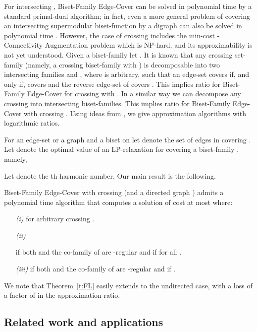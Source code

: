 For intersecting , {\sf Biset-Family Edge-Cover} can be solved in polynomial time by a 
standard primal-dual algorithm; in fact, even a more general problem of covering an intersecting supermodular 
biset-function by a digraph can also be solved in polynomial time \cite{F-R}. 
However, the case of crossing  includes the min-cost {\sf -Connectivity Augmentation} problem
which is NP-hard, and its approxi\-mability is not yet understood.
Given a biset-family  let .
It is known that any crossing set-family  
(namely, a crossing biset-family  with ) 
is decomposable into two intersecting families 
 and 
, where  is arbitrary,
such that an edge-set  covers  if, and only if,  covers  
and the reverse edge-set of  covers .
This implies ratio  for {\sf Biset-Family Edge-Cover} for crossing 
with .
In a similar way we can decompose any crossing  into 
 intersecting biset-families. 
This implies ratio  for {\sf Biset-Family Edge-Cover} with crossing . 
Using ideas from \cite{RW,KN2,FL,N,N-subs}, we give approximation algorithms with logarithmic ratios.

For an edge-set or a graph  and a biset  on 
let  denote the set of edges in  covering . 
Let  denote the optimal value of an LP-relaxation for covering
a biset-family , namely,


Let  denote the th harmonic number.
Our main result is the following.

\vspace{0.2cm}

\begin{theorem} \label{t:FL} 
{\sf Biset-Family Edge-Cover} with crossing  (and a directed graph ) 
admits a polynomial time algorithm that computes a solution of cost at most
 where: 
\begin{itemize}
\item[{\em (i)}]
 for arbitrary crossing . 
\item[{\em (ii)}]

if both  and the co-family of  are -regular 
and if  for all .
\item[{\em (iii)}]
 if both  
and the co-family of  are -regular and if .
\end{itemize}
\end{theorem}

We note that Theorem~\ref{t:FL} easily extends to the undirected case,
with a loss of a factor of  in the approximation ratio.

\subsection{Related work and applications}

